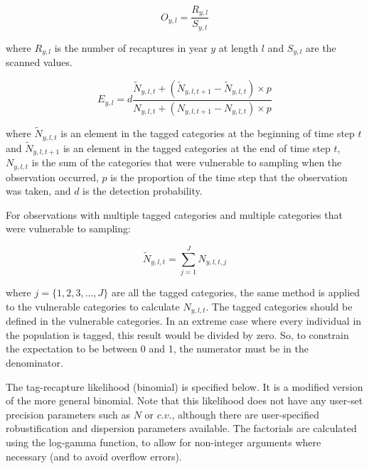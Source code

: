 \begin{equation}
O_{y,l} = \frac{R_{y,l}}{S_{y,l}}
\end{equation}

where $R_{y,l}$ is the number of recaptures in year $y$ at length $l$ and $S_{y,l}$ are the scanned values.

\begin{equation}
E_{y,l} = d \frac{\tilde{N}_{y,l,t} +  (\tilde{N}_{y,l,t + 1} - \tilde{N}_{y,l,t}) \times p}
{N_{y,l,t} + (N_{y,l,t+1} - N_{y,l,t}) \times p}
\end{equation}

where $\tilde{N}_{y,l,t}$ is an element in the tagged categories at the beginning of time step $t$ and $\tilde{N}_{y,l,t + 1}$ is an element in the tagged categories at the end of time step $t$, $N_{y,l,t}$ is the sum of the categories that were vulnerable to sampling when the observation occurred, $p$ is the proportion of the time step that the observation was taken, and $d$ is the detection probability.

For observations with multiple tagged categories and multiple categories that were vulnerable to sampling:

\begin{equation}
\tilde{N}_{y,l,t} = \sum_{j = 1}^{J} N_{y,l,t,j}
\end{equation}

where $j = \{1,2,3,...,J\}$  are all the tagged categories, the same method is applied to the vulnerable categories to calculate $N_{y,l,t}$. The tagged categories should be defined in the vulnerable categories. In an extreme case where every individual in the population is tagged, this result would be divided by zero. So, to constrain the expectation to be between 0 and 1, the numerator must be in the denominator.

The tag-recapture likelihood (binomial) is specified below. It is a modified version of the more general binomial. Note that this likelihood does not have any user-set precision parameters such as $N$ or $c.v.$, although there are user-specified robustification and dispersion parameters available. The factorials are calculated using the log-gamma function, to allow for non-integer arguments where necessary (and to avoid overflow errors).

\else

\paragraph*{}\label{sec:Observation-ProportionsAtLength}

